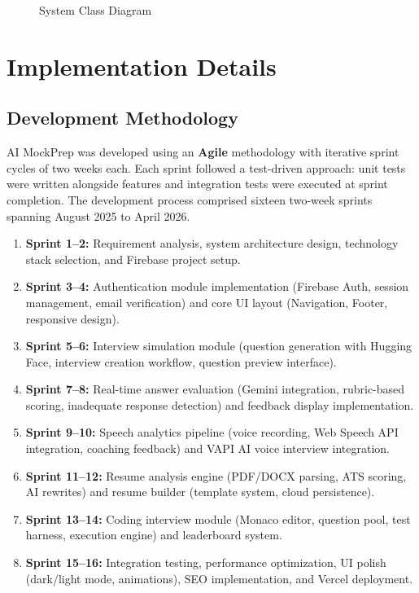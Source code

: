 \documentclass[12pt,a4paper,oneside]{report}
\begin{document}
\begin{figure}[H]
\centering
{}
\caption{System Class Diagram}
\label{fig:class_diagram}
\end{figure}


\chapter{Implementation Details}
\label{ch:impl_detail}

\section{Development Methodology}

AI MockPrep was developed using an \textbf{Agile} methodology with iterative sprint cycles of two weeks each. Each sprint followed a test-driven approach: unit tests were written alongside features and integration tests were executed at sprint completion. The development process comprised sixteen two-week sprints spanning August 2025 to April 2026.

\begin{enumerate}
  \item \textbf{Sprint 1--2:} Requirement analysis, system architecture design, technology stack selection, and Firebase project setup.
  \item \textbf{Sprint 3--4:} Authentication module implementation (Firebase Auth, session management, email verification) and core UI layout (Navigation, Footer, responsive design).
  \item \textbf{Sprint 5--6:} Interview simulation module (question generation with Hugging Face, interview creation workflow, question preview interface).
  \item \textbf{Sprint 7--8:} Real-time answer evaluation (Gemini integration, rubric-based scoring, inadequate response detection) and feedback display implementation.
  \item \textbf{Sprint 9--10:} Speech analytics pipeline (voice recording, Web Speech API integration, coaching feedback) and VAPI AI voice interview integration.
  \item \textbf{Sprint 11--12:} Resume analysis engine (PDF/DOCX parsing, ATS scoring, AI rewrites) and resume builder (template system, cloud persistence).
  \item \textbf{Sprint 13--14:} Coding interview module (Monaco editor, question pool, test harness, execution engine) and leaderboard system.
  \item \textbf{Sprint 15--16:} Integration testing, performance optimization, UI polish (dark/light mode, animations), SEO implementation, and Vercel deployment.
\end{enumerate}
\end{document}
